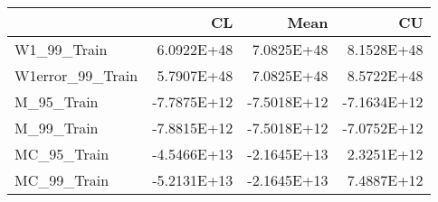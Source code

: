 \begin{tabular}{lrrr}
\toprule
{} &          CL &        Mean &          CU \\
\midrule
W1\_99\_Train      &  6.0922E+48 &  7.0825E+48 &  8.1528E+48 \\
W1error\_99\_Train &  5.7907E+48 &  7.0825E+48 &  8.5722E+48 \\
M\_95\_Train       & -7.7875E+12 & -7.5018E+12 & -7.1634E+12 \\
M\_99\_Train       & -7.8815E+12 & -7.5018E+12 & -7.0752E+12 \\
MC\_95\_Train      & -4.5466E+13 & -2.1645E+13 &  2.3251E+12 \\
MC\_99\_Train      & -5.2131E+13 & -2.1645E+13 &  7.4887E+12 \\
\bottomrule
\end{tabular}
